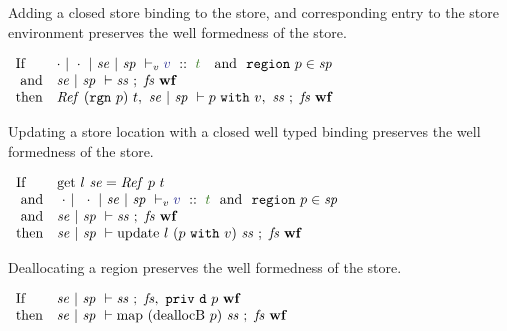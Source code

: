 \begin{lemma} Adding a closed store binding to the store, and corresponding entry to the store environment preserves the well formedness of the store.
\end{lemma}
$
\begin{array}{ll}
    \pIf        & \TypeV{\nil}{\nil}{\mse}{\msp}{v}{t}
  ~~~\pand~~      \sregion{p} \in \msp
\\ ~\pand       & \WfFS {\mse}{\msp}{\mss}{\mfs}
\\  \pthen      & \WfFS {\tcRef~ (\trgn{p})~ t,~ \mse}
                         {\msp}
                         {\sbvalue{p}{v},~ \mss}
                         {\mfs}
\end{array}
$
\qqed


\begin{lemma} Updating a store location with a closed well typed binding preserves the well formedness of the store.
\end{lemma}
$
\begin{array}{ll}
    \pIf        & \mget~ l~ \mse = \tref{p}{t}
\\ ~\pand       & \TypeV {~\nil}{~\nil}{\mse} {\msp}{v}{t}
  ~~\pand~~       \sregion{p} \in \msp
\\ ~\pand       & \WfFS  {\mse} {\msp} {\mss} {\mfs}
\\  \pthen      & \WfFS  {\mse} {\msp} {\mupdate~ l~ (\sbvalue{p}{v})~ \mss} {\mfs}
\end{array}
$
\qqed


\begin{lemma} Deallocating a region preserves the well formedness of the store.
\end{lemma}
$
\begin{array}{ll}
    \textrm{If}        & \mathit{se} ~|~ \mathit{sp} ~\vdash \mathit{ss} ~;~ \mathit{fs},~ \texttt{priv}~ \texttt{d}~ p ~ {\mathbf{wf}}
\\  \textrm{then}      & \mathit{se} ~|~ \mathit{sp} ~\vdash \textrm{map}~ (\textrm{deallocB}~ p)~ \mathit{ss} ~;~ \mathit{fs} ~ {\mathbf{wf}}
\end{array}
$

